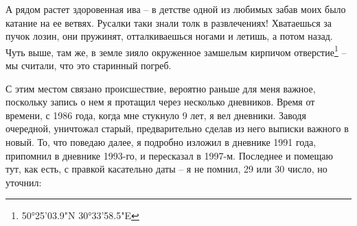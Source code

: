 А рядом растет здоровенная ива – в детстве одной из любимых забав моих было катание на ее ветвях. Русалки таки знали толк в развлечениях! Хватаешься за пучок лозин, они пружинят, отталкиваешься ногами и летишь, а потом назад. Чуть выше, там же, в земле зияло окруженное замшелым кирпичом отверстие\footnote{50°25'03.9"N 30°33'58.5"E} – мы считали, что это старинный погреб.

С этим местом связано происшествие, вероятно раньше для меня важное, поскольку запись о нем я протащил через несколько дневников. Время от времени, с 1986 года, когда мне стукнуло 9 лет, я вел дневники. Заводя очередной, уничтожал старый, предварительно сделав из него выписки важного в новый. То, что поведаю далее, я подробно изложил в дневнике 1991 года, припомнил в дневнике 1993-го, и пересказал в 1997-м. Последнее и помещаю тут, как есть, с правкой касательно даты – я не помнил, 29 или 30 число, но уточнил:

